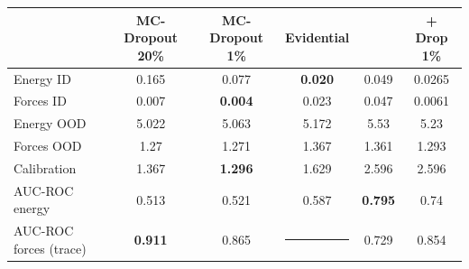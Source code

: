 
\centering
\begin{tabular}{lccccc}
\toprule
{} & MC-Dropout 20\% & MC-Dropout 1\% & Evidential & \oursacro{} & \oursacro{} + Drop 1\%\\
\midrule
Energy ID  &   0.165 & 0.077 & \textbf{0.020} & 0.049 & 0.0265\\
Forces ID  &   0.007 & \textbf{0.004} & 0.023 & 0.047 & 0.0061 \\
Energy OOD &   5.022 & 5.063 & 5.172 & 5.53 & 5.23\\
Forces OOD &   1.27 & 1.271 & 1.367 & 1.361 & 1.293 \\
\midrule
Calibration    &   1.367 & \textbf{1.296} & 1.629 & 2.596 & 2.596 \\
\midrule
AUC-ROC energy &   0.513 & 0.521 & 0.587 & \textbf{0.795} & 0.74\\
AUC-ROC forces (trace)  & \textbf{0.911} & 0.865 & \noindent\rule{0.8cm}{0.6pt} & 0.729 & 0.854 \\
\bottomrule
\end{tabular}